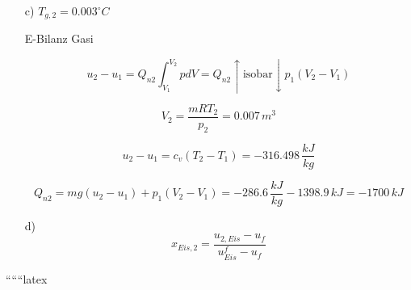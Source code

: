 \begin{itemize}
    \item[c)] $T_{g,2} = 0.003^\circ C$
    
    \item[] E-Bilanz Gasi
    
    \[
    u_2 - u_1 = Q_{n2} \int_{V_1}^{V_2} p dV = Q_{n2} \uparrow \text{isobar} \downarrow p_1 (V_2 - V_1)
    \]
    
    \[
    V_2 = \frac{mRT_2}{p_2} = 0.007 \, m^3
    \]
    
    \[
    u_2 - u_1 = c_v (T_2 - T_1) = -316.498 \, \frac{kJ}{kg}
    \]
    
    \[
    Q_{n2} = mg(u_2 - u_1) + p_1 (V_2 - V_1) = -286.6 \, \frac{kJ}{kg} - 1398.9 \, kJ = -1700 \, kJ
    \]
    
    \item[d)] 
    \[
    x_{Eis,2} = \frac{u_{2,Eis} - u_f}{u_{Eis}^f - u_f}
    \]
\end{itemize}

``````latex


